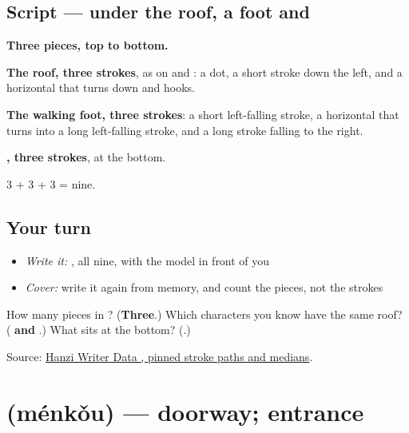 \subsection*{Script — under the roof, a foot and }

\begin{quote}
\end{quote}

\textbf{Three pieces, top to bottom.}

\textbf{The roof, three strokes}, as on  and : a dot, a short stroke down the left, and a horizontal that turns down and hooks.

\textbf{The walking foot, three strokes}: a short left-falling stroke, a horizontal that turns into a long left-falling stroke, and a long stroke falling to the right.

\textbf{, three strokes}, at the bottom.

3 + 3 + 3 = nine.

\subsection*{Your turn}
\begin{itemize}
\raggedright
  \item \emph{Write it:} , all nine, with the model in front of you
  \item \emph{Cover:} write it again from memory, and count the pieces, not the strokes
\end{itemize}

\begin{tcolorbox}[breakable,colback=teal!4,colframe=teal!35!black,title={Before you move on}]
How many pieces in ? (\textbf{Three}.) Which characters you know have the same roof? (\textbf{ and }.) What sits at the bottom? (\textbf{}.)

Source: \href{https://raw.githubusercontent.com/chanind/hanzi-writer-data/68d10a4b21150cae5e1ebbd223eed289cf32d90c/data/\%E5\%AE\%A2.json}{Hanzi Writer Data , pinned stroke paths and medians}.
\end{tcolorbox}
\section[\texorpdfstring{\zh{门口} (ménkǒu)}{门口 (ménkǒu)}]{ (ménkǒu) — doorway; entrance}

